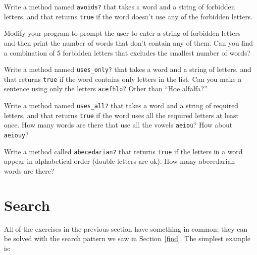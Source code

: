 \documentclass[10pt]{book}
\begin{document}
\begin{exercise} 

Write a method named {\tt avoids?}
that takes a word and a string of forbidden letters, and
that returns {\tt true} if the word doesn't use any of the forbidden
letters.

Modify your program to prompt the user to enter a string
of forbidden letters and then print the number of words that
don't contain any of them.
Can you find a combination of 5 forbidden letters that
excludes the smallest number of words?

\end{exercise}



\begin{exercise}

Write a method named \verb"uses_only?" that takes a word and a
string of letters, and that returns {\tt true} if the word contains
only letters in the list.  Can you make a sentence using only the
letters {\tt acefhlo}?  Other than ``Hoe alfalfa?''

\end{exercise}


\begin{exercise} 

Write a method named \verb"uses_all?" that takes a word and a
string of required letters, and that returns {\tt true} if the word
uses all the required letters at least once.  How many words are there
that use all the vowels {\tt aeiou}?  How about {\tt aeiouy}?

\end{exercise}


\begin{exercise}

Write a method called \verb"abecedarian?" that returns
{\tt true} if the letters in a word appear in alphabetical order
(double letters are ok).  
How many abecedarian words are there?


\end{exercise}



\section{Search}
\label{search}

All of the exercises in the previous section have something
in common; they can be solved with the search pattern we saw
in Section~\ref{find}.  The simplest example is:
\end{document}
